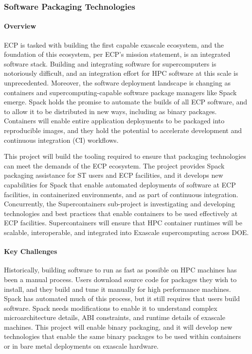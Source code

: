 \subsubsection{ Software Packaging Technologies} \label{subsubsect:sw-packaging}


\paragraph{Overview}

ECP is tasked with building the first capable exascale ecosystem, and the
foundation of this ecosystem, per ECP's mission statement, is an
integrated software stack.  Building and integrating software for
supercomputers is notoriously difficult, and an integration effort for
HPC software at this scale is unprecedented.  Moreover, the software
deployment landscape is changing as containers and supercomputing-capable
software package managers like Spack emerge.  Spack holds the promise to
automate the builds of all ECP software, and to allow it to be
distributed in new ways, including as binary packages.  Containers will
enable entire application deployments to be packaged into reproducible
images, and they hold the potential to accelerate development and
continuous integration (CI) workflows.

This project will build the tooling required to ensure that packaging
technologies can meet the demands of the ECP ecosystem.  The project
provides Spack packaging assistance for ST users and ECP facilities, and
it develops new capabilities for Spack that enable automated deployments
of software at ECP facilities, in containerized environments, and as part
of continuous integration.  Concurrently, the Supercontainers
sub-project is investigating and developing technologies and best
practices that enable containers to be used effectively at ECP
facilities. Supercontainers will ensure that HPC container runtimes will
be scalable, interoperable, and integrated into Exascale supercomputing
across DOE.


\paragraph{Key Challenges}

Historically, building software to run as fast as possible on HPC
machines has been a manual process.  Users download source code for
packages they wish to install, and they build and tune it manually for
high performance machines. Spack has automated much of this process, but
it still requires that users build software.  Spack needs
modifications to enable it to understand complex microarchitecture
details, ABI constraints, and runtime details of exascale machines.  This
project will enable binary packaging, and it will develop new
technologies that enable the same binary packages to be used within
containers or in bare metal deployments on exascale hardware.

